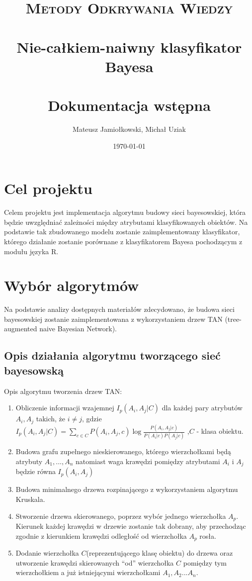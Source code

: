 \documentclass[paper=a4, fontsize=11pt]{scrartcl} %
\title{	
\normalfont \normalsize 
\textsc{Metody Odkrywania Wiedzy} \\ [25pt] %
\horrule{0.5pt} \\[0.4cm] %
\huge Nie-całkiem-naiwny klasyfikator Bayesa \\ %
\horrule{2pt} \\[0.5cm] %
\LARGE Dokumentacja wstępna
}%
\author{Mateusz Jamiołkowski, Michał Uziak} %
\date{\normalsize\today} %
\numberwithin{equation}{section} %
\numberwithin{figure}{section} %
\numberwithin{table}{section} %
\begin{document}
\maketitle %


\section{Cel projektu}

Celem projektu jest implementacja algorytmu budowy sieci bayesowskiej, która będzie uwzględniać zależności między atrybutami klasyfikowanych obiektów. Na podstawie tak zbudowanego modelu zostanie zaimplementowany klasyfikator, którego działanie zostanie porównane z klasyfikatorem Bayesa pochodzącym z modułu języka R.

\section{Wybór algorytmów}
Na podstawie analizy dostępnych materiałów zdecydowano, że budowa sieci bayesowskiej zostanie zaimplementowana z wykorzystaniem drzew TAN (tree-augmented naive Bayesian Network). 

\subsection{Opis działania algorytmu tworzącego sieć bayesowską}



Opis algorytmu tworzenia drzew TAN:
\begin{enumerate}
 \item Obliczenie informacji wzajemnej $I_p(A_i,A_j|C)$ dla każdej pary atrybutów $A_i, A_j$ takich, że $i\neq j $, gdzie 
 $I_p(A_i,A_j|C)= \sum_{c \in C}^{} {P(A_i,A_j,c) \log\frac{P(A_i,A_j|c)}{P(A_i|c)P(A_j|c)} } $ ,$C$ - klasa obiektu.
 
 \item  Budowa grafu zupełnego nieskierowanego, którego wierzchołkami będą atrybuty $A_1,... ,A_n$ natomiast waga krawędzi pomiędzy atrybutami $A_i$ i $A_j$ 		będzie równa $I_p(A_i,A_j)$
 
 \item  Budowa minimalnego drzewa rozpinającego z wykorzystaniem algorytmu Kruskala.
 \item  Stworzenie drzewa skierowanego, poprzez wybór jednego wierzchołka $A_p$. Kierunek każdej krawędzi w drzewie zostanie tak dobrany, aby przechodząc 		zgodnie z kierunkiem krawędzi odległość od wierzchołka $A_p$ rosła.
 \item Dodanie wierzchołka $C$(reprezentującego klasę obiektu) do drzewa oraz utworzenie krawędzi skierowanych “od” wierzchołka $C$ pomiędzy tym wierzchołkiem a już istniejącymi wierzchołkami $A_1,A_2...A_n$.
 
\end{enumerate}
\end{document}
